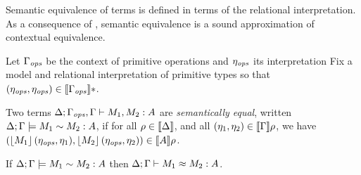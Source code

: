 Semantic equivalence of terms is defined in terms of the relational
interpretation. As a consequence of , semantic
equivalence is a sound approximation of contextual equivalence.

  Let $\Gamma_{\mathit{ops}}$ be the context of primitive operations and $\eta_{\mathit{ops}}$  its interpretation 
Fix a model and relational interpretation of primitive types so that
  $(\eta_{\mathit{ops}}, \eta_{\mathit{ops}}) \in  \llbracket \Gamma_{\mathit{ops}} \rrbracket *$.

\begin{definition}\label{def:semantic-equality}
  Two terms $\Delta; \Gamma_{\mathit{ops}}, \Gamma \vdash M_1 , M_2 : A$
  are
  \emph{semantically equal},
  written ${\Delta};{\Gamma}\models{M_1}\sim{M_2}:{A}$, if for all $\rho \in
  \llbracket \Delta \rrbracket$, and all $(\eta_1,\eta_2) \in
  \llbracket \Gamma \rrbracket \rho$, we have
  $(\left\lfloor{M_1}\right\rfloor(\eta_{\mathit{ops}},
  \eta_1),\left\lfloor{M_2}\right\rfloor(\eta_{\mathit{ops}}, \eta_2)) \in
  \llbracket A \rrbracket\rho$.
\end{definition}

\begin{theorem}[Soundness]\label{thm:soundness}
If ${\Delta};{\Gamma}\models{M_1}\sim{M_2}:{A}$ then
${\Delta};{\Gamma}\vdash{M_1}\approx{M_2}:{A}$.
\end{theorem}



